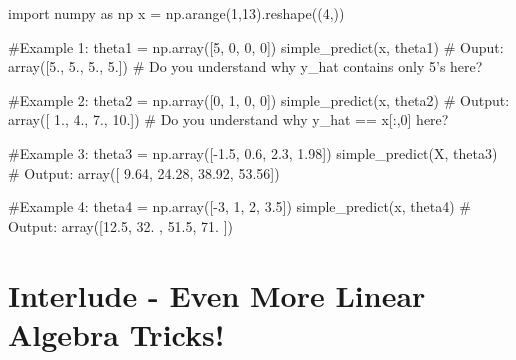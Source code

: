 \documentclass[]{article}
\newenvironment{Shaded}{\begin{snugshade}}{\end{snugshade}}
\newcommand{\CommentTok}[1]{\textcolor[rgb]{0.48,0.49,0.49}{#1}}
\newcommand{\DecValTok}[1]{\textcolor[rgb]{0.96,0.45,0.00}{#1}}
\newcommand{\FloatTok}[1]{\textcolor[rgb]{0.96,0.45,0.00}{#1}}
\newcommand{\ImportTok}[1]{\textcolor[rgb]{0.15,0.68,0.38}{#1}}
\newcommand{\NormalTok}[1]{\textcolor[rgb]{0.81,0.81,0.76}{#1}}
\newcommand{\OperatorTok}[1]{\textcolor[rgb]{0.81,0.81,0.76}{#1}}
\begin{document}
\begin{Shaded}
\begin{Highlighting}[]
\ImportTok{import}\NormalTok{ numpy }\ImportTok{as}\NormalTok{ np}
\NormalTok{x }\OperatorTok{=}\NormalTok{ np.arange(}\DecValTok{1}\NormalTok{,}\DecValTok{13}\NormalTok{).reshape((}\DecValTok{4}\NormalTok{,))}

\CommentTok{#Example 1:}
\NormalTok{theta1 }\OperatorTok{=}\NormalTok{ np.array([}\DecValTok{5}\NormalTok{, }\DecValTok{0}\NormalTok{, }\DecValTok{0}\NormalTok{, }\DecValTok{0}\NormalTok{])}
\NormalTok{simple_predict(x, theta1)}
\CommentTok{# Ouput:}
\NormalTok{array([}\FloatTok{5.}\NormalTok{, }\FloatTok{5.}\NormalTok{, }\FloatTok{5.}\NormalTok{, }\FloatTok{5.}\NormalTok{])}
\CommentTok{# Do you understand why y_hat contains only 5's here?  }


\CommentTok{#Example 2:}
\NormalTok{theta2 }\OperatorTok{=}\NormalTok{ np.array([}\DecValTok{0}\NormalTok{, }\DecValTok{1}\NormalTok{, }\DecValTok{0}\NormalTok{, }\DecValTok{0}\NormalTok{])}
\NormalTok{simple_predict(x, theta2)}
\CommentTok{# Output:}
\NormalTok{array([ }\FloatTok{1.}\NormalTok{,  }\FloatTok{4.}\NormalTok{,  }\FloatTok{7.}\NormalTok{, }\FloatTok{10.}\NormalTok{])}
\CommentTok{# Do you understand why y_hat == x[:,0] here?  }


\CommentTok{#Example 3:}
\NormalTok{theta3 }\OperatorTok{=}\NormalTok{ np.array([}\OperatorTok{-}\FloatTok{1.5}\NormalTok{, }\FloatTok{0.6}\NormalTok{, }\FloatTok{2.3}\NormalTok{, }\FloatTok{1.98}\NormalTok{])}
\NormalTok{simple_predict(X, theta3)}
\CommentTok{# Output:}
\NormalTok{array([ }\FloatTok{9.64}\NormalTok{, }\FloatTok{24.28}\NormalTok{, }\FloatTok{38.92}\NormalTok{, }\FloatTok{53.56}\NormalTok{])}


\CommentTok{#Example 4:}
\NormalTok{theta4 }\OperatorTok{=}\NormalTok{ np.array([}\OperatorTok{-}\DecValTok{3}\NormalTok{, }\DecValTok{1}\NormalTok{, }\DecValTok{2}\NormalTok{, }\FloatTok{3.5}\NormalTok{])}
\NormalTok{simple_predict(x, theta4)}
\CommentTok{# Output:}
\NormalTok{array([}\FloatTok{12.5}\NormalTok{, }\FloatTok{32.}\NormalTok{ , }\FloatTok{51.5}\NormalTok{, }\FloatTok{71.}\NormalTok{ ])}
\end{Highlighting}
\end{Shaded}

\clearpage

\hypertarget{interlude---even-more-linear-algebra-tricks-1}{%
\section{Interlude - Even More Linear Algebra
Tricks!}\label{interlude---even-more-linear-algebra-tricks-1}}
\end{document}
